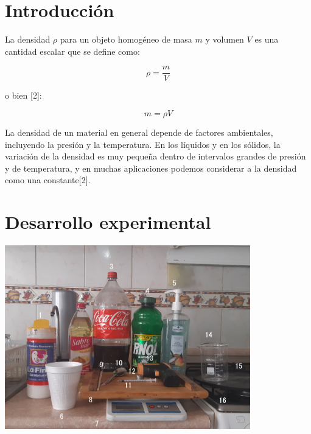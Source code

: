 \documentclass[DIV=calc, paper=a4, fontsize=11pt]{scrartcl}
\newenvironment{Figura}
  {\par\medskip\noindent\minipage{\linewidth}}
  {\endminipage\par\medskip}
\begin{document}
\begin{multicols}{2}




\section*{Introducción}

La densidad $\rho$ para un objeto homogéneo de masa $m$ y volumen $V$ es una cantidad escalar que se define como:

\begin{equation}
    \rho = \frac{m}{V}
\end{equation}

o bien [2]:

\begin{equation}
    m = \rho V
\end{equation}

La densidad de un material en general depende de factores ambientales, incluyendo la presión y la temperatura. En los líquidos y en los sólidos, la variación de la densidad es muy pequeña dentro de  intervalos grandes de presión y de temperatura, y en muchas aplicaciones podemos considerar a la densidad como una constante[2].





\section*{Desarrollo experimental}

\begin{Figura}
\centering
    \includegraphics[width=0.8\textwidth]{20220302_135437.jpg}
    \label{fig}
\end{Figura}


\end{multicols}
\end{document}
